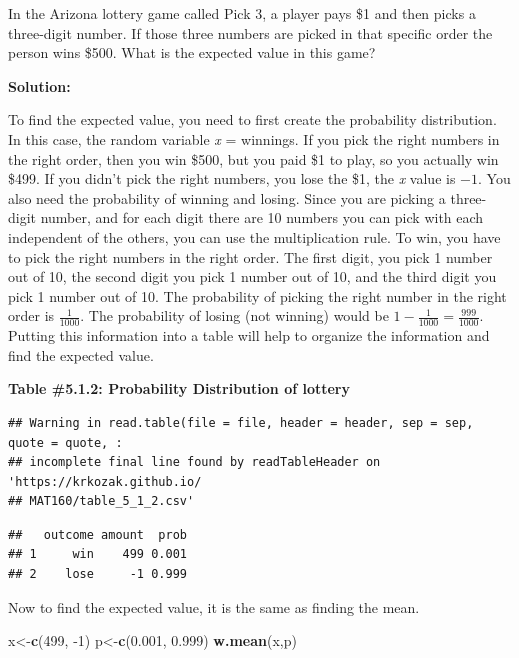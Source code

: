 \documentclass[
]{book}
\newenvironment{Shaded}{\begin{snugshade}}{\end{snugshade}}
\newcommand{\DecValTok}[1]{\textcolor[rgb]{0.00,0.00,0.81}{#1}}
\newcommand{\FloatTok}[1]{\textcolor[rgb]{0.00,0.00,0.81}{#1}}
\newcommand{\KeywordTok}[1]{\textcolor[rgb]{0.13,0.29,0.53}{\textbf{#1}}}
\newcommand{\NormalTok}[1]{#1}
\begin{document}
In the Arizona lottery game called Pick 3, a player pays \$1 and then picks a three-digit number. If those three numbers are picked in that specific order the person wins \$500. What is the expected value in this game?

\textbf{Solution:}

To find the expected value, you need to first create the probability distribution. In this case, the random variable \emph{x} = winnings. If you pick the right numbers in the right order, then you win \$500, but you paid \$1 to play, so you actually win \$499. If you didn't pick the right numbers, you lose the \$1, the \emph{x} value is \(-1\). You also need the probability of winning and losing. Since you are picking a three-digit number, and for each digit there are 10 numbers you can pick with each independent of the others, you can use the multiplication rule. To win, you have to pick the right numbers in the right order. The first digit, you pick 1 number out of 10, the second digit you pick 1 number out of 10, and the third digit you pick 1 number out of 10. The probability of picking the right number in the right order is \(\frac{1}{1000}\). The probability of losing (not winning) would be \(1-\frac{1}{1000}=\frac{999}{1000}\). Putting this information into a table will help to organize the information and find the expected value.

\textbf{Table \#5.1.2: Probability Distribution of lottery}

\begin{verbatim}
## Warning in read.table(file = file, header = header, sep = sep, quote = quote, :
## incomplete final line found by readTableHeader on 'https://krkozak.github.io/
## MAT160/table_5_1_2.csv'
\end{verbatim}

\begin{verbatim}
##   outcome amount  prob
## 1     win    499 0.001
## 2    lose     -1 0.999
\end{verbatim}

Now to find the expected value, it is the same as finding the mean.

\begin{Shaded}
\begin{Highlighting}[]
\NormalTok{x<-}\KeywordTok{c}\NormalTok{(}\DecValTok{499}\NormalTok{, }\DecValTok{-1}\NormalTok{)}
\NormalTok{p<-}\KeywordTok{c}\NormalTok{(}\FloatTok{0.001}\NormalTok{, }\FloatTok{0.999}\NormalTok{)}
\KeywordTok{w.mean}\NormalTok{(x,p)}
\end{Highlighting}
\end{Shaded}
\end{document}
